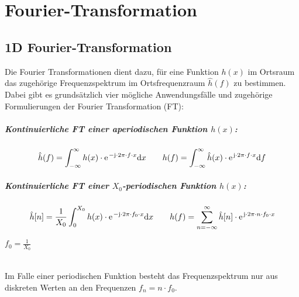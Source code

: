 



\chapter{Fourier-Transformation}

\section{1D Fourier-Transformation}
Die Fourier Transformationen dient dazu, für eine Funktion $h(x)$ im Ortsraum das zugehörige Frequenzspektrum im Ortsfrequenzraum $\hat{h}(f)$  zu bestimmen.
Dabei gibt es grundsätzlich vier mögliche Anwendungsfälle und zugehörige Formulierungen der Fourier Transformation (FT):

\paragraph{Kontinuierliche FT einer aperiodischen Funktion $h(x)$:}
\[
	\hat{h}(f) = \int_{-\infty}^{\infty} h(x) \cdot \mathrm{e\;\!}^{-\mathrm{j} \cdot 2\pi \cdot f \cdot x}\mathrm{d} x \qquad
	h(f) = \int_{-\infty}^{\infty} \hat{h}(x) \cdot \mathrm{e\;\!}^{\mathrm{j} \cdot 2\pi \cdot f \cdot x}\mathrm{d} f
\]

\paragraph{Kontinuierliche FT einer $X_0$-periodischen Funktion $h(x)$:}
\[
	\hat{h}[n] = \frac{1}{X_0}\int_{0}^{X_0} h(x) \cdot \mathrm{e\;\!}^{-\mathrm{j} \cdot 2\pi \cdot f_0 \cdot x}\mathrm{d} x \qquad
	h(f) = \sum_{n=-\infty}^{\infty} \hat{h}[n] \cdot \mathrm{e\;\!}^{\mathrm{j} \cdot 2\pi \cdot n \cdot f_0 \cdot x}
\]
\begin{footnotesize}
	$f_0 = \frac{1}{X_0}$\\
\end{footnotesize}
~\\
Im Falle einer periodischen Funktion besteht das Frequenzspektrum nur aus diskreten Werten an den Frequenzen $f_n = n \cdot f_0$.

